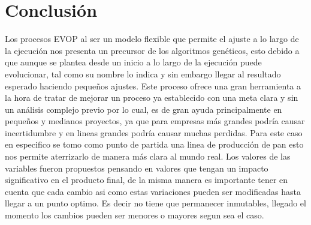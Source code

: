\section{Conclusión}

Los procesos EVOP al ser un modelo flexible que permite el ajuste a lo largo de la ejecución nos presenta un precursor de los algoritmos genéticos, esto debido a que aunque se plantea desde un inicio a lo largo de la ejecución puede evolucionar, tal como su nombre lo indica y sin embargo llegar al resultado esperado haciendo pequeños ajustes.
Este proceso ofrece una gran herramienta a la hora de tratar de mejorar un proceso ya establecido con una meta clara y sin un análisis complejo previo por lo cual, es de gran ayuda principalmente en pequeños y medianos proyectos, ya que para empresas más grandes podría causar incertidumbre y en lineas grandes podría causar muchas perdidas.
Para este caso en especifico se tomo como punto de partida una linea de producción de pan esto nos permite aterrizarlo de manera más clara al mundo real.
Los valores de las variables fueron propuestos pensando en valores que tengan un impacto significativo en el producto final, de la misma manera es importante tener en cuenta que cada cambio asi como estas variaciones pueden ser modificadas hasta llegar a un punto optimo.
Es decir no tiene que permanecer inmutables, llegado el momento los cambios pueden ser menores o mayores segun sea el caso.